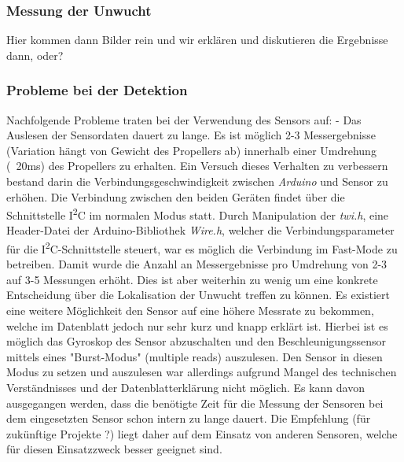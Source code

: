 \subsubsection*{Messung der Unwucht}
Hier kommen dann Bilder rein und wir erklären und diskutieren die Ergebnisse dann, oder?

\subsubsection*{Probleme bei der Detektion}
Nachfolgende Probleme traten bei der Verwendung des Sensors auf:
- Das Auslesen der Sensordaten dauert zu lange. Es ist möglich 2-3 Messergebnisse (Variation hängt von Gewicht des Propellers ab) innerhalb einer Umdrehung (~20ms) des Propellers zu erhalten. Ein Versuch dieses Verhalten zu verbessern bestand darin die Verbindungsgeschwindigkeit zwischen \textit{Arduino} und Sensor zu erhöhen. Die Verbindung zwischen den beiden Geräten findet über die Schnittstelle I\textsuperscript{2}C im normalen Modus statt. Durch Manipulation der \textit{twi.h}, eine Header-Datei der Arduino-Bibliothek \textit{Wire.h}, welcher die Verbindungsparameter für die I\textsuperscript{2}C-Schnittstelle steuert, war es möglich die Verbindung im Fast-Mode zu betreiben. Damit wurde die Anzahl an Messergebnisse pro Umdrehung von 2-3 auf 3-5 Messungen erhöht. Dies ist aber weiterhin zu wenig um eine konkrete Entscheidung über die Lokalisation der Unwucht treffen zu können.
Es existiert eine weitere Möglichkeit den Sensor auf eine höhere Messrate zu bekommen, welche im Datenblatt jedoch nur sehr kurz und knapp erklärt ist. Hierbei ist es möglich das Gyroskop des Sensor abzuschalten und den Beschleunigungssensor mittels eines "Burst-Modus" (multiple reads) auszulesen. Den Sensor in diesen Modus zu setzen und auszulesen war allerdings aufgrund Mangel des technischen Verständnisses und der Datenblatterklärung nicht möglich.
Es kann davon ausgegangen werden, dass die benötigte Zeit für die Messung der Sensoren bei dem eingesetzten Sensor schon intern zu lange dauert. Die Empfehlung (für zukünftige Projekte ?) liegt daher auf dem Einsatz von anderen Sensoren, welche für diesen Einsatzzweck besser geeignet sind.

